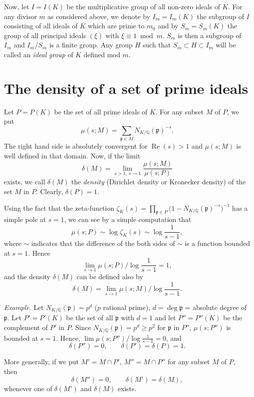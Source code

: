 Now, let $I=I(K)$ be the multiplicative group of all non-zero ideals of
$K$. For any divisor $m$ as considered above, we denote by $I_{m}
=I_{m}(K)$ the subgroup of $I$ consisting of all ideals of $K$ which are
prime to $m_{0}$ and by $S_{m}=S_{m}(K)$ the group of all principal
ideals $(\xi)$ with $\xi\equiv 1\bmod m$. $S_{m}$ is then a subgroup of
$I_{m}$ and $I_{m}/S_{m}$ is a finite group. Any group $H$ such that
$S_{m}\subset H\subset I_{m}$ will be called an \emph{ideal group} of $K$
defined mod $m$.

\section{The density of a set of prime ideals}

Let $P=P(K)$ be the set of all prime ideals of $K$. For any subset $M$ of
$P$, we put
\[
\mu(s;M)=\sum_{\mathfrak{p}\in M}N_{K/\mathbb{Q}}(\mathfrak{p})^{-s}.
\]
The right hand side is absolutely convergent for $\operatorname{Re}(s)>1$
and $\mu(s;M)$ is well defined in that domain. Now, if the limit
\[
\delta(M)=\lim_{s>1,\ s\to 1}\frac{\mu(s;M)}{\mu(s;P)}
\]
exists, we call $\delta(M)$ the \emph{density} (Dirichlet density or
Kronecker density) of the set $M$ in $P$. Clearly, $\delta(P)=1$.

Using the fact that the zeta-function
$\zeta_{K}(s)=\prod_{\mathfrak{p}\in P}
\bigl(1-N_{K/\mathbb{Q}}(\mathfrak{p})^{-s}\bigr)^{-1}$ has a simple pole
at $s=1$, we can see by a simple computation that
\[
\mu(s;P)\sim\log\zeta_{K}(s)\sim\log\frac{1}{s-1},
\]
where $\sim$ indicates that the difference of the both sides of $\sim$ is
a function bounded at $s=1$. Hence
\[
\lim_{s\to 1}\mu(s;P)\big/\log\frac{1}{s-1}=1,
\]
and the density $\delta(M)$ can be defined also by
\[
\delta(M)=\lim_{s\to 1}\mu(s;M)\big/\log\frac{1}{s-1}.
\]

\emph{Example.} Let $N_{K/\mathbb{Q}}(\mathfrak{p})=p^{d}$ ($p$ rational
prime), $d=\deg\mathfrak{p}$ = absolute degree of $\mathfrak{p}$. Let
$P'=P'(K)$ be the set of all $\mathfrak{p}$ with $d=1$ and let
$P''=P''(K)$ be the complement of $P'$ in $P$. Since
$N_{K/\mathbb{Q}}(\mathfrak{p})=p^{d}\geq p^{2}$ for $\mathfrak{p}$ in
$P''$, $\mu(s;P'')$ is bounded at $s=1$. Hence,
$\lim\mu(s;P'')/\log\frac{1}{s-1}=0$, and
\[
\delta(P'')=0,\qquad\delta(P')=\delta(P)=1.
\]

More generally, if we put $M'=M\cap P'$, $M''=M\cap P''$ for any subset
$M$ of $P$, then
\[
\delta(M'')=0,\qquad\delta(M')=\delta(M),
\]
whenever one of $\delta(M')$ and $\delta(M)$ exists.

